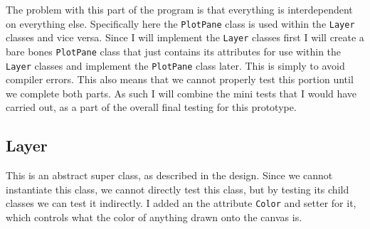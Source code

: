 \documentclass[../../../../main.tex]{subfiles}
\begin{document}
The problem with this part of the program is that everything is interdependent on everything else. Specifically here the \texttt{PlotPane} class is used within the \texttt{Layer} classes and vice versa. Since I will implement the \texttt{Layer} classes first I will create a bare bones  \texttt{PlotPane} class that just contains its attributes for use within the \texttt{Layer} classes and implement the \texttt{PlotPane} class later. This is simply to avoid compiler errors. This also means that we cannot properly test this portion until we complete both parts. As such I will combine the mini tests that I would have carried out, as a part of the overall final testing for this prototype.
\newpage
\subsection{Layer}
This is an abstract super class, as described in the design. Since we cannot instantiate this class, we cannot directly test this class, but by testing its child classes we can test it indirectly. I added an the attribute \texttt{Color} and setter for it, which controls what the color of anything drawn onto the canvas is.
\end{document}
